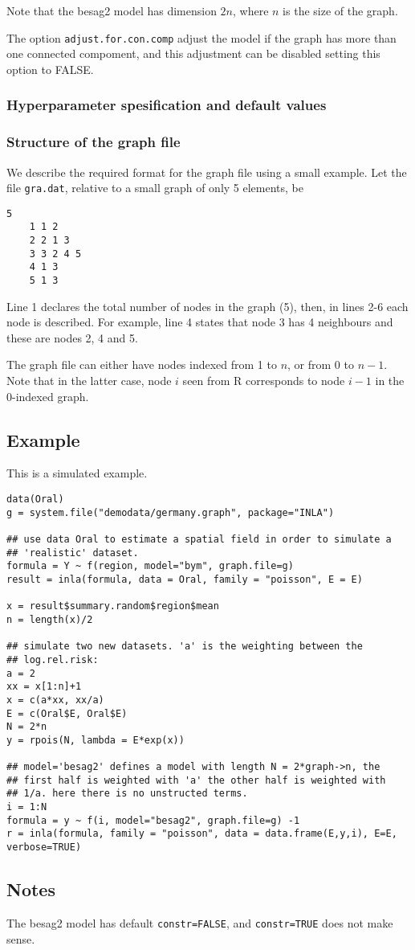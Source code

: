 \documentclass[a4paper,11pt]{article}
\begin{document}
Note that the besag2 model has dimension $2 n$, where $n$ is the size
of the graph.

The option \verb|adjust.for.con.comp| adjust the model if the graph
has more than one connected compoment, and this adjustment can be
disabled setting this option to FALSE.

\subsubsection*{Hyperparameter spesification and default values}




\subsubsection*{Structure of the graph file}

We describe the required format for the graph file using a small
example. Let the file {\tt gra.dat}, relative to a small graph of only
5 elements, be
\begin{lstlisting}[basicstyle=\footnotesize]
    5
    1 1 2
    2 2 1 3
    3 3 2 4 5 
    4 1 3
    5 1 3
\end{lstlisting}
Line 1 declares the total number of nodes in the graph (5), then, in
lines 2-6 each node is described. For example, line 4 states that node
3 has 4 neighbours and these are nodes 2, 4 and 5.

The graph file can either have nodes indexed from 1 to $n$, or from 0
to $n-1$. Note that in the latter case, node $i$ seen from R
corresponds to node $i-1$ in the 0-indexed graph.



\subsection*{Example}

This is a simulated example.

\begin{verbatim}
data(Oral)
g = system.file("demodata/germany.graph", package="INLA")

## use data Oral to estimate a spatial field in order to simulate a
## 'realistic' dataset.
formula = Y ~ f(region, model="bym", graph.file=g)
result = inla(formula, data = Oral, family = "poisson", E = E)

x = result$summary.random$region$mean
n = length(x)/2

## simulate two new datasets. 'a' is the weighting between the
## log.rel.risk:
a = 2
xx = x[1:n]+1
x = c(a*xx, xx/a)
E = c(Oral$E, Oral$E)
N = 2*n
y = rpois(N, lambda = E*exp(x))

## model='besag2' defines a model with length N = 2*graph->n, the
## first half is weighted with 'a' the other half is weighted with
## 1/a. here there is no unstructed terms.
i = 1:N
formula = y ~ f(i, model="besag2", graph.file=g) -1
r = inla(formula, family = "poisson", data = data.frame(E,y,i), E=E, verbose=TRUE)
\end{verbatim}


\subsection*{Notes}

The besag2 model has default \texttt{constr=FALSE}, and
\texttt{constr=TRUE} does not make sense.
\end{document}
